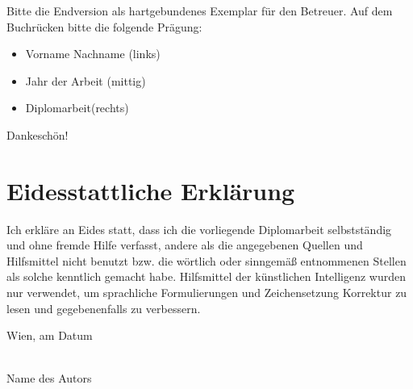\vfill

Bitte die Endversion als hartgebundenes Exemplar für den Betreuer. Auf dem Buch\-rücken bitte die folgende Prägung:
\begin{itemize}
  \item Vorname Nachname (links)
  \item Jahr der Arbeit (mittig)
  \item Diplomarbeit(rechts)
\end{itemize}
Dankeschön!

\cleardoublepage


\chapter*{Eidesstattliche Erkl\"arung}
\thispagestyle{empty}

\vspace*{2cm}

Ich erkl\"are an Eides statt, dass ich die vorliegende Diplomarbeit selbstst\"andig und ohne fremde Hilfe verfasst, andere als die angegebenen Quellen und Hilfsmittel nicht benutzt bzw. die w\"ortlich oder sinngem\"a{\ss} entnommenen Stellen als solche kenntlich gemacht habe.
Hilfsmittel der künstlichen Intelligenz wurden nur verwendet, 
um sprachliche Formulierungen und Zeichensetzung Korrektur zu lesen und gegebenenfalls zu verbessern.

\vspace*{3cm}

\noindent
Wien, am {\color{change}Datum} %
%
\hfill
%
\begin{minipage}[t]{5cm}
  \centering
  \underline{\hspace*{5cm}}\\
  \small\color{change}Name des Autors
\end{minipage}

\cleardoublepage